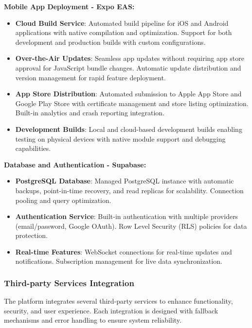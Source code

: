 \documentclass[12pt,a4paper]{article}
\begin{document}
\textbf{Mobile App Deployment - Expo EAS:}
\begin{itemize}
  \item \textbf{Cloud Build Service}: Automated build pipeline for iOS and Android applications with native compilation and optimization. Support for both development and production builds with custom configurations.
  \item \textbf{Over-the-Air Updates}: Seamless app updates without requiring app store approval for JavaScript bundle changes. Automatic update distribution and version management for rapid feature deployment.
  \item \textbf{App Store Distribution}: Automated submission to Apple App Store and Google Play Store with certificate management and store listing optimization. Built-in analytics and crash reporting integration.
  \item \textbf{Development Builds}: Local and cloud-based development builds enabling testing on physical devices with native module support and debugging capabilities.
\end{itemize}

\textbf{Database and Authentication - Supabase:}
\begin{itemize}
  \item \textbf{PostgreSQL Database}: Managed PostgreSQL instance with automatic backups, point-in-time recovery, and read replicas for scalability. Connection pooling and query optimization.
  \item \textbf{Authentication Service}: Built-in authentication with multiple providers (email/password, Google OAuth). Row Level Security (RLS) policies for data protection.
  \item \textbf{Real-time Features}: WebSocket connections for real-time updates and notifications. Subscription management for live data synchronization.
\end{itemize}

\subsubsection{Third-party Services Integration}

The platform integrates several third-party services to enhance functionality, security, and user experience. Each integration is designed with fallback mechanisms and error handling to ensure system reliability.
\end{document}
